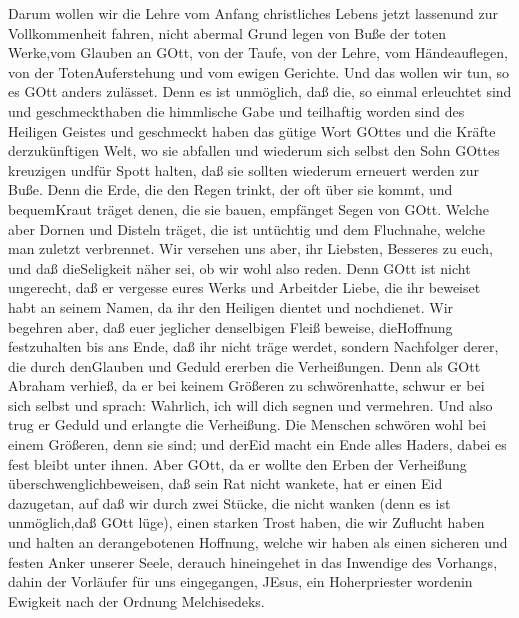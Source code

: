  Darum wollen wir die Lehre vom Anfang christliches Lebens
jetzt lassenund zur Vollkommenheit fahren, nicht abermal Grund legen von
Buße der toten Werke,vom Glauben an GOtt,  von der Taufe,
von der Lehre, vom Händeauflegen, von der TotenAuferstehung und vom
ewigen Gerichte.  Und das wollen wir tun, so es GOtt anders
zulässet.  Denn es ist unmöglich, daß die, so einmal
erleuchtet sind und geschmeckthaben die himmlische Gabe und teilhaftig
worden sind des Heiligen Geistes  und geschmeckt haben das
gütige Wort GOttes und die Kräfte derzukünftigen Welt,  wo
sie abfallen und wiederum sich selbst den Sohn GOttes kreuzigen undfür
Spott halten, daß sie sollten wiederum erneuert werden zur Buße.
 Denn die Erde, die den Regen trinkt, der oft über sie
kommt, und bequemKraut träget denen, die sie bauen, empfänget Segen von
GOtt.  Welche aber Dornen und Disteln träget, die ist
untüchtig und dem Fluchnahe, welche man zuletzt verbrennet. 
Wir versehen uns aber, ihr Liebsten, Besseres zu euch, und daß
dieSeligkeit näher sei, ob wir wohl also reden.  Denn GOtt
ist nicht ungerecht, daß er vergesse eures Werks und Arbeitder Liebe,
die ihr beweiset habt an seinem Namen, da ihr den Heiligen dientet und
nochdienet.  Wir begehren aber, daß euer jeglicher
denselbigen Fleiß beweise, dieHoffnung festzuhalten bis ans Ende,
 daß ihr nicht träge werdet, sondern Nachfolger derer, die
durch denGlauben und Geduld ererben die Verheißungen.  Denn
als GOtt Abraham verhieß, da er bei keinem Größeren zu schwörenhatte,
schwur er bei sich selbst  und sprach: Wahrlich, ich will
dich segnen und vermehren.  Und also trug er Geduld und
erlangte die Verheißung.  Die Menschen schwören wohl bei
einem Größeren, denn sie sind; und derEid macht ein Ende alles Haders,
dabei es fest bleibt unter ihnen.  Aber GOtt, da er wollte
den Erben der Verheißung überschwenglichbeweisen, daß sein Rat nicht
wankete, hat er einen Eid dazugetan,  auf daß wir durch
zwei Stücke, die nicht wanken (denn es ist unmöglich,daß GOtt lüge),
einen starken Trost haben, die wir Zuflucht haben und halten an
derangebotenen Hoffnung,  welche wir haben als einen
sicheren und festen Anker unserer Seele, derauch hineingehet in das
Inwendige des Vorhangs,  dahin der Vorläufer für uns
eingegangen, JEsus, ein Hoherpriester wordenin Ewigkeit nach der Ordnung
Melchisedeks.


